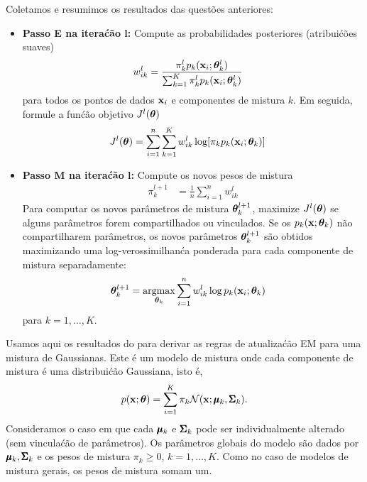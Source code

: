 \begin{exenumerate}
    \begin{solution}
        Coletamos e resumimos os resultados das quest\~oes anteriores:
        \begin{itemize}
            \item \textbf{Passo E na itera\'c\~ao l:} Compute as probabilidades posteriores (atribui\'c\~oes suaves)
            \begin{align}
                w_{ik}^l & =  \frac{ \pi^l_k p_k(\mathbf{x}_i; \boldsymbol{\theta}^l_k)}{ \sum_{k=1}^K \pi^l_k p_k(\mathbf{x}_i; \boldsymbol{\theta}^l_k)} 
            \end{align}
            para todos os pontos de dados $\mathbf{x}_i$ e componentes de mistura $k$. Em seguida, formule
            a fun\'c\~ao objetivo $J^l(\boldsymbol{\theta})$
            \begin{align}
                J^l(\boldsymbol{\theta}) & = \sum_{i=1}^n  \sum_{k=1}^K w_{ik}^l  \log[  \pi_k  p_k(\mathbf{x}_i; \boldsymbol{\theta}_k) ]
            \end{align}
            \item  \textbf{Passo M na itera\'c\~ao l:} Compute os novos pesos de mistura
            \begin{align}
                \pi_k^{l+1} &=  \frac{1}{n}\sum_{i=1}^n w_{ik}^l
            \end{align}
            Para computar os novos par\^ametros de mistura $\boldsymbol{\theta}_k^{l+1}$, maximize
            $J^l(\boldsymbol{\theta})$ se alguns par\^ametros forem compartilhados ou vinculados. Se os $p_k(\mathbf{x};
            \boldsymbol{\theta}_k)$ n\~ao compartilharem par\^ametros, os novos par\^ametros $\boldsymbol{\theta}_k^{l+1}$
            s\~ao obtidos maximizando uma log-verossimilhan\'ca ponderada para cada componente de
            mistura separadamente:
            \begin{align}
                \boldsymbol{\theta}_k^{l+1} &= \operatorname*{\mathrm{argmax}}_{\boldsymbol{\theta}_k} \sum_{i=1}^n  w_{ik}^l \log p_k(\mathbf{x}_i; \boldsymbol{\theta}_k)
            \end{align}
            para $k=1, \ldots, K$.
        \end{itemize}
    \end{solution}
    
\end{exenumerate}



\label{ex:EM-MoG-alt}

Usamos aqui os resultados do  para derivar as regras de atualiza\'c\~ao EM para uma mistura de Gaussianas. Este \'e um modelo de mistura onde cada
componente de mistura \'e uma distribui\'c\~ao Gaussiana, isto \'e,
\begin{align}
    p(\mathbf{x}; \boldsymbol{\theta}) = \sum_{i=1}^K \pi_k \mathcal{N}(\mathbf{x}; \pmb{\mu}_k, \pmb{\Sigma}_k).
\end{align}
Consideramos o caso em que cada $\pmb{\mu}_k$ e $\pmb{\Sigma}_k$ pode ser individualmente
alterado (sem vincula\'c\~ao de par\^ametros). Os par\^ametros globais do modelo s\~ao dados
por $\pmb{\mu}_k, \pmb{\Sigma}_k$ e os pesos de mistura $\pi_k \ge 0$, $k=1, \ldots,
K$. Como no caso de modelos de mistura gerais, os pesos de mistura somam um.

